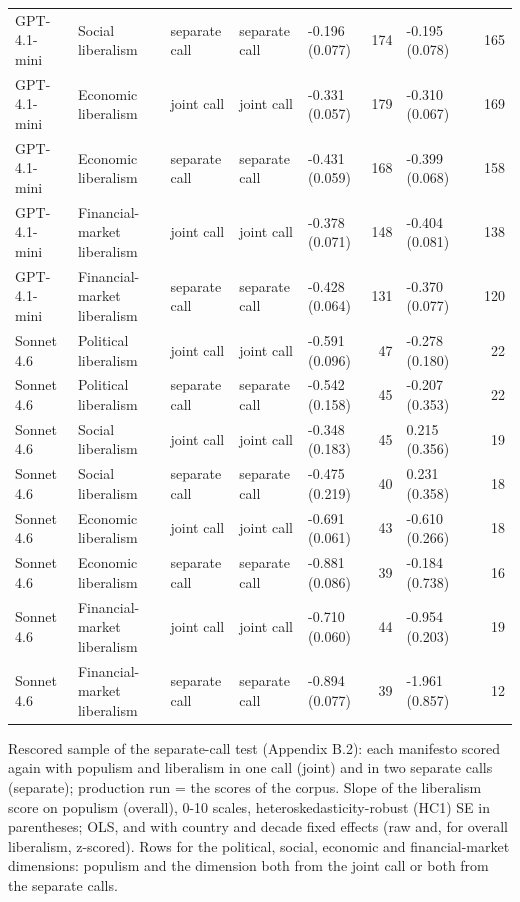 \begin{table}[ht]
{\begin{tabular}{lllllrllr}
GPT-4.1-mini & Social liberalism & separate call & separate call & -0.196 (0.077) & 174 & -0.195 (0.078) &  & 165 \\
GPT-4.1-mini & Economic liberalism & joint call & joint call & -0.331 (0.057) & 179 & -0.310 (0.067) &  & 169 \\
GPT-4.1-mini & Economic liberalism & separate call & separate call & -0.431 (0.059) & 168 & -0.399 (0.068) &  & 158 \\
GPT-4.1-mini & Financial-market liberalism & joint call & joint call & -0.378 (0.071) & 148 & -0.404 (0.081) &  & 138 \\
GPT-4.1-mini & Financial-market liberalism & separate call & separate call & -0.428 (0.064) & 131 & -0.370 (0.077) &  & 120 \\
Sonnet 4.6 & Political liberalism & joint call & joint call & -0.591 (0.096) & 47 & -0.278 (0.180) &  & 22 \\
Sonnet 4.6 & Political liberalism & separate call & separate call & -0.542 (0.158) & 45 & -0.207 (0.353) &  & 22 \\
Sonnet 4.6 & Social liberalism & joint call & joint call & -0.348 (0.183) & 45 & 0.215 (0.356) &  & 19 \\
Sonnet 4.6 & Social liberalism & separate call & separate call & -0.475 (0.219) & 40 & 0.231 (0.358) &  & 18 \\
Sonnet 4.6 & Economic liberalism & joint call & joint call & -0.691 (0.061) & 43 & -0.610 (0.266) &  & 18 \\
Sonnet 4.6 & Economic liberalism & separate call & separate call & -0.881 (0.086) & 39 & -0.184 (0.738) &  & 16 \\
Sonnet 4.6 & Financial-market liberalism & joint call & joint call & -0.710 (0.060) & 44 & -0.954 (0.203) &  & 19 \\
Sonnet 4.6 & Financial-market liberalism & separate call & separate call & -0.894 (0.077) & 39 & -1.961 (0.857) &  & 12 \\
\bottomrule
\end{tabular}}
\par\smallskip
\begin{minipage}{\linewidth}\scriptsize Rescored sample of the separate-call test (Appendix B.2): each manifesto scored again with populism and liberalism in one call (joint) and in two separate calls (separate); production run = the scores of the corpus. Slope of the liberalism score on populism (overall), 0-10 scales, heteroskedasticity-robust (HC1) SE in parentheses; OLS, and with country and decade fixed effects (raw and, for overall liberalism, z-scored). Rows for the political, social, economic and financial-market dimensions: populism and the dimension both from the joint call or both from the separate calls.\end{minipage}
\end{table}
